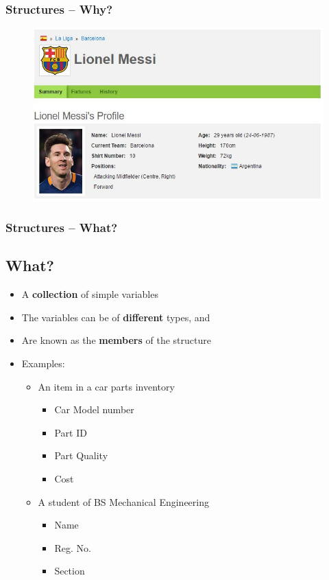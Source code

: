 \documentclass{beamer}
\begin{document}
\begin{frame}
    \frametitle{Structures -- Why?}
    \begin{figure}
        \centering
        \includegraphics[scale=0.6]{player_profile.jpg}
    \end{figure}
\end{frame}

\begin{frame}
    \frametitle{Structures -- What?}
    \subsection{What?} %
    \label{sub:what}
    \begin{itemize}
        \item A \textbf{collection} of simple variables
        \item The variables can be of \textbf{different} types, and
        \item Are known as the \textbf{members} of the structure
        \item Examples:
        \begin{itemize}
            \item An item in a car parts inventory
            \begin{itemize}
                \item Car Model number
                \item Part ID
                \item Part Quality
                \item Cost
            \end{itemize}
            \item A student of BS Mechanical Engineering
            \begin{itemize}
                \item Name
                \item Reg. No.
                \item Section
            \end{itemize}
        \end{itemize}
    \end{itemize}
\end{frame}
\end{document}
